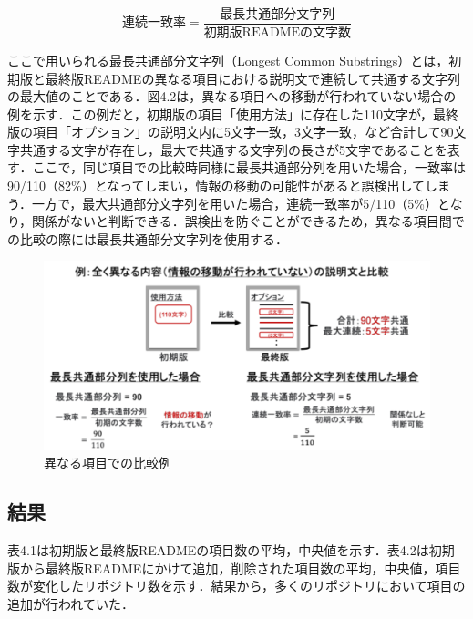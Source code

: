 \documentclass[submit]{ipsj}
\begin{document}
\begin{equation}
\label{calculate_rate}
\mbox{連続一致率} = \frac {\mbox{最長共通部分文字列}} {\mbox{初期版READMEの文字数}}
\end{equation}
\vspace{5pt}

ここで用いられる最長共通部分文字列（Longest Common Substrings）とは，初期版と最終版READMEの異なる項目における説明文で連続して共通する文字列の最大値のことである．図4.2は，異なる項目への移動が行われていない場合の例を示す．この例だと，初期版の項目「使用方法」に存在した110文字が，最終版の項目「オプション」の説明文内に5文字一致，3文字一致，など合計して90文字共通する文字が存在し，最大で共通する文字列の長さが5文字であることを表す．ここで，同じ項目での比較時同様に最長共通部分列を用いた場合，一致率は90/110（82\%）となってしまい，情報の移動の可能性があると誤検出してしまう．一方で，最大共通部分文字列を用いた場合，連続一致率が5/110（5\%）となり，関係がないと判断できる．誤検出を防ぐことができるため，異なる項目間での比較の際には最長共通部分文字列を使用する．

\begin{figure}[t]
 	\centering
		\includegraphics[width=1.0\linewidth]{./IPSJ202303_Ishioka/LCS_split.pdf}
	\caption{異なる項目での比較例}
	\label{fig:oss_developments_eq}
\end{figure}


\subsection{結果}
表4.1は初期版と最終版READMEの項目数の平均，中央値を示す．表4.2は初期版から最終版READMEにかけて追加，削除された項目数の平均，中央値，項目数が変化したリポジトリ数を示す．結果から，多くのリポジトリにおいて項目の追加が行われていた．
\end{document}
